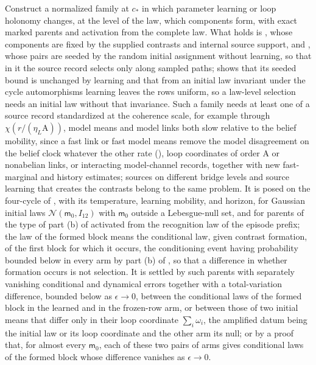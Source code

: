 Construct a normalized family at \(c_*\) in which parameter learning or loop
holonomy changes, at the level of the law, which components form, with exact
marked parents and activation from the complete law. What holds is
, whose components are fixed by the
supplied contrasts and internal source support, and
, whose pairs are seeded by the
random initial assignment without learning, so that in it the source record
selects only along sampled paths; 
shows that its seeded bound is unchanged by learning and that from an initial
law invariant under the cycle automorphisms learning leaves the rows uniform,
so a law-level selection needs an initial law without that invariance. Such a
family needs at least one of a source record standardized at the coherence
scale, for example through \(\chi(r/(\eta_L\mathrm A))\), model means and
model links both slow relative to the belief mobility, since a fast link or
fast model means remove the model disagreement on the belief clock whatever
the other rate (), loop coordinates
of order \(\mathrm A\) or nonabelian links, or interacting model-channel
records, together with new fast-marginal and history estimates; sources on
different bridge levels and source learning that creates the contrasts belong
to the same problem. It is posed on the four-cycle of
, with its temperature, learning
mobility, and horizon, for Gaussian initial laws
\(\mathcal N(\mathsf m_0,I_{12})\) with \(\mathsf m_0\) outside a
Lebesgue-null set, and for parents of the type of part (b) of
 activated from the recognition law
of the episode prefix; the law of the formed block means the conditional law,
given contrast formation, of the first block for which it occurs, the
conditioning event having probability bounded below in every arm by part (b)
of , so that a difference in
whether formation occurs is not selection. It is settled by such parents with
separately vanishing conditional and dynamical errors together with a
total-variation difference, bounded below as \(\epsilon\to0\), between the
conditional laws of the formed block in the learned and in the frozen-row
arm, or between those of two initial means that differ only in their loop
coordinate \(\sum_i\omega_i\), the amplified datum being the initial law or
its loop coordinate and the other arm its null; or by a proof that, for
almost every \(\mathsf m_0\), each of these two pairs of arms gives
conditional laws of the formed block whose difference vanishes as
\(\epsilon\to0\).

